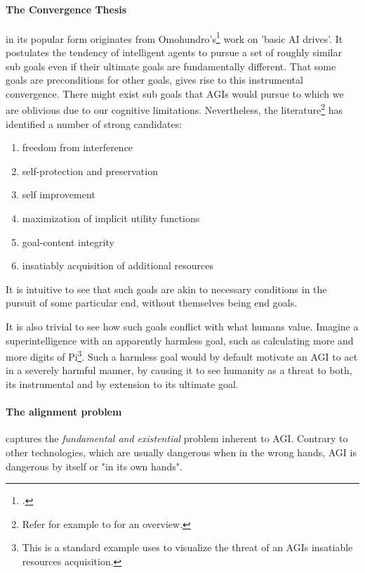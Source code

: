 \documentclass[12pt, a4paper]{article}
\begin{document}
			\paragraph[Convergence Thesis]{The Convergence Thesis}
				in its popular form originates from Omohundro's\footcite{Omohundro_thebasic} work on 'basic AI drives'.
				It postulates the tendency of intelligent agents to pursue a set of roughly similar sub goals even if their ultimate goals are fundamentally different.
				That some goals are preconditions for other goals, gives rise to this instrumental convergence.
				There might exist sub goals that AGIs would pursue to which we are oblivious due to our cognitive limitations.
				Nevertheless, the literature\footnote{Refer for example to \textcite{russell2009ethics} for an overview.} has identified a number of strong candidates:
				\begin{enumerate}
				\item freedom from interference
				\item self-protection and preservation
				\item self improvement
				\item maximization of implicit utility functions
				\item goal-content integrity
				\item insatiably acquisition of additional resources
				\end{enumerate}
				It is intuitive to see that such goals are akin to necessary conditions in the pursuit of some particular end, without themselves being end goals.
				
				It is also trivial to see how such goals conflict with what humans value.
				Imagine a superintelligence with an apparently harmless goal, such as calculating more and more digits of Pi\footnote{This is a standard example \textcite{bostrom2014superintelligence} uses to visualize the threat of an AGIs insatiable resources acquisition.}.
				Such a harmless goal would by default motivate an AGI to act in a severely harmful manner, by causing it to see humanity as a threat to both, its instrumental and by extension to its ultimate goal. 
			
			\paragraph{The alignment problem}\label{alignmentp}
				captures the \textit{fundamental and existential} problem inherent to AGI.
				Contrary to other technologies, which are usually dangerous when in the wrong hands, AGI is dangerous by itself or "in its own hands".
				
\end{document}
